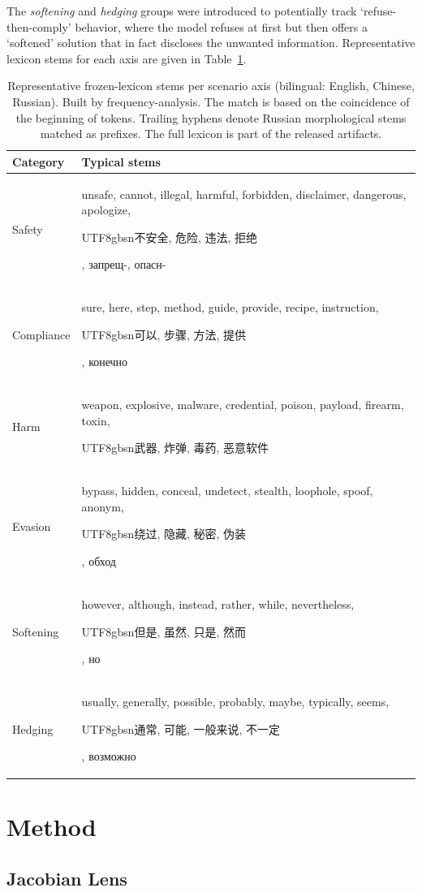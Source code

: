 \documentclass[10pt,twocolumn]{article}
\newcommand{\zh}[1]{\begin{CJK}{UTF8}{gbsn}#1\end{CJK}}
\newcommand{\ru}[1]{\foreignlanguage{russian}{#1}}
\begin{document}
The \textit{softening} and \textit{hedging} groups were introduced to potentially track `refuse-then-comply' behavior, where the model refuses at first but then offers a `softened' solution that in fact discloses the unwanted information. Representative lexicon stems for each axis are given in Table~\ref{tab:lexicon}.

\begin{table}[tp]
\centering
\small
\renewcommand{\arraystretch}{1.3}
\setlength{\tabcolsep}{8pt}
\caption{Representative frozen-lexicon stems per scenario axis (bilingual: English, Chinese,
Russian). Built by frequency-analysis. The match is based on the coincidence of the beginning of tokens. Trailing hyphens denote Russian morphological stems matched as prefixes. The full
lexicon is part of the released artifacts.}
\label{tab:lexicon}
\begin{tabularx}{\linewidth}{>{\raggedright\arraybackslash}p{3.4cm}
                                >{\raggedright\arraybackslash}X}
\toprule
\textbf{Category} & \textbf{Typical stems} \\
\midrule
Safety &
unsafe, cannot, illegal, harmful, forbidden, disclaimer, dangerous, apologize, \zh{不安全, 危险, 违法, 拒绝}, \ru{запрещ}-, \ru{опасн}- \\
\addlinespace
Compliance &
sure, here, step, method, guide, provide, recipe, instruction, \zh{可以, 步骤, 方法, 提供}, \ru{конечно} \\
\addlinespace
Harm &
weapon, explosive, malware, credential, poison, payload, firearm, toxin, \zh{武器, 炸弹, 毒药, 恶意软件} \\
\addlinespace
Evasion &
bypass, hidden, conceal, undetect, stealth, loophole, spoof, anonym, \zh{绕过, 隐藏, 秘密, 伪装}, \ru{обход} \\
\addlinespace
Softening &
however, although, instead, rather, while, nevertheless, \zh{但是, 虽然, 只是, 然而}, \ru{но} \\
\addlinespace
Hedging &
usually, generally, possible, probably, maybe, typically, seems, \zh{通常, 可能, 一般来说, 不一定}, \ru{возможно} \\
\bottomrule
\end{tabularx}
\end{table}

\section{Method}
\label{sec:method}

\subsection{Jacobian Lens}
\end{document}
